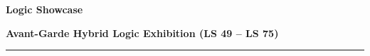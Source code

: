 \newcommand{\onlinecallout}[1]{%
  \begin{tcolorbox}[
    colback=cbmint!20!white,
    colframe=cbdarkteal,
    boxrule=0.7pt,
    arc=1.2mm,
    left=2.5mm, right=2.5mm, top=1.5mm, bottom=1.5mm,
    before=\vspace{1.5mm}, after=\vspace{1mm}
  ]
    \raggedright
    \textbf{\footnotesize Online Interactive Puzzle:}\\[0.5mm]
    {\scriptsize This puzzle features dynamic reveals and cannot be solved on paper. Please solve online at:\\
    \url{#1}}
  \end{tcolorbox}%
}


{}

\begin{center}
{\fontsize{26}{32}\selectfont \textbf{\color{cbdarkteal}Logic Showcase}}
\vspace{2mm}

{\large \textbf{Avant-Garde Hybrid Logic Exhibition (LS 49 -- LS 75)}}
\vspace{1mm}

{\color{cbdarkteal}\rule{0.6\textwidth}{1.2pt}}
\end{center}

\vspace{2mm}


